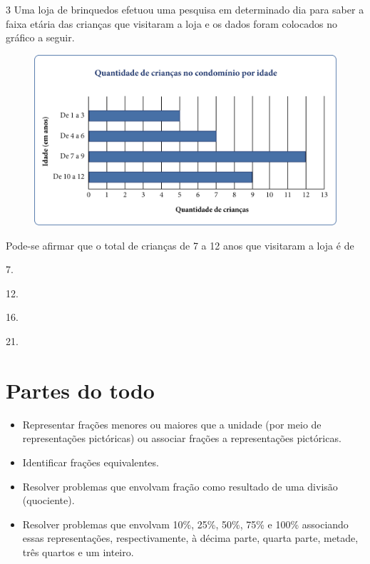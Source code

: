 \num{3} Uma loja de brinquedos efetuou uma pesquisa em determinado dia para
saber a faixa etária das crianças que visitaram a loja e os dados foram
colocados no gráfico a seguir.

\begin{figure}[htpb!]
\centering
\includegraphics[width=\textwidth]{media/image51.png}
\end{figure}

Pode-se afirmar que o total de crianças
de 7 a 12 anos que visitaram a loja é de

\begin{escolha}
\item
  7.
\item
  12.
\item
  16.
\item
  21.
\end{escolha}


\chapter{Partes do todo}


\begin{itemize}
\item Representar frações menores ou maiores que a unidade (por meio de
representações pictóricas) ou associar frações a representações pictóricas.

\item Identificar frações equivalentes.

\item Resolver problemas que envolvam fração como resultado de uma divisão
(quociente).

\item Resolver problemas que envolvam 10\%, 25\%, 50\%, 75\% e 100\%
associando essas representações, respectivamente, à décima parte, quarta parte, metade,
três quartos e um inteiro.
\end{itemize}

